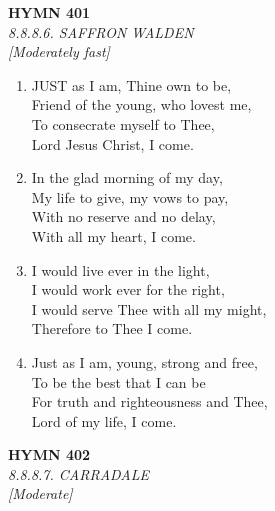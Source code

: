 \newpage
\begin{center}
    {\Large \textbf{HYMN 401}}
    \\
    \textit{8.8.8.6. SAFFRON WALDEN}
    \\
    \textit{\small [Moderately fast]}
\end{center}
\vspace{1em}

\begin{enumerate}
    \item JUST as I am, Thine own to be, \\
        Friend of the young, who lovest me, \\
        To consecrate myself to Thee, \\
        Lord Jesus Christ, I come.

    \item In the glad morning of my day, \\
        My life to give, my vows to pay, \\
        With no reserve and no delay, \\
        With all my heart, I come.

    \item I would live ever in the light, \\
        I would work ever for the right, \\
        I would serve Thee with all my might, \\
        Therefore to Thee I come.

    \item Just as I am, young, strong and free, \\
        To be the best that I can be \\
        For truth and righteousness and Thee, \\
        Lord of my life, I come.

\end{enumerate}

\newpage
\begin{center}
    {\Large \textbf{HYMN 402}}
    \\
    \textit{8.8.8.7. CARRADALE}
    \\
    \textit{\small [Moderate]}
\end{center}
\vspace{1em}

